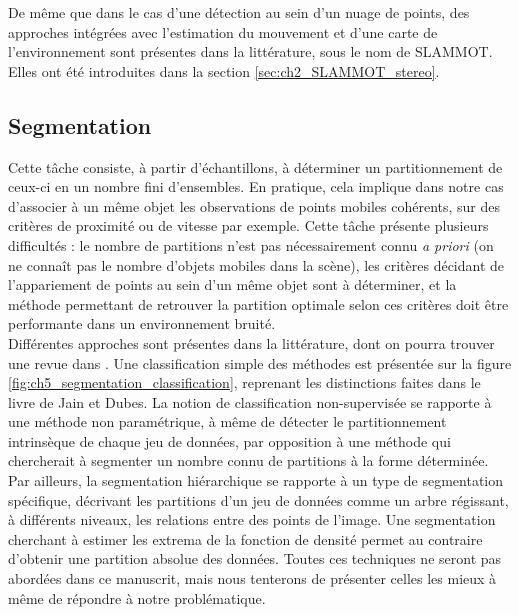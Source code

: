 De même que dans le cas d'une détection au sein d'un nuage de points, des approches intégrées avec l'estimation du mouvement et d'une carte de l'environnement sont présentes dans la littérature, sous le nom de SLAMMOT. Elles ont été introduites dans la section \ref{sec:ch2_SLAMMOT_stereo}. 

\subsection{Segmentation}
Cette tâche consiste, à partir d'échantillons, à déterminer un partitionnement de ceux-ci en un nombre fini d'ensembles. En pratique, cela implique dans notre cas d'associer à un même objet les observations de points mobiles cohérents, sur des critères de proximité ou de vitesse par exemple. Cette tâche présente plusieurs difficultés : le nombre de partitions n'est pas nécessairement connu \emph{a priori} (on ne connaît pas le nombre d'objets mobiles dans la scène), les critères décidant de l'appariement de points au sein d'un même objet sont à déterminer, et la méthode permettant de retrouver la partition optimale selon ces critères doit être performante dans un environnement bruité.\\
Différentes approches sont présentes dans la littérature, dont on pourra trouver une revue dans \cite{Jain1988}. Une classification simple des méthodes est présentée sur la figure \ref{fig:ch5_segmentation_classification}, reprenant les distinctions faites dans le livre de Jain et Dubes. La notion de classification non-supervisée se rapporte à une méthode non paramétrique, à même de détecter le partitionnement intrinsèque de chaque jeu de données, par opposition à une méthode qui chercherait à segmenter un nombre connu de partitions à la forme déterminée. Par ailleurs, la segmentation hiérarchique se rapporte à un type de segmentation spécifique, décrivant les partitions d'un jeu de données comme un arbre régissant, à différents niveaux, les relations entre des points de l'image. Une segmentation cherchant à estimer les extrema de la fonction de densité permet au contraire d'obtenir une partition \og absolue\fg{} des données. Toutes ces techniques ne seront pas abordées dans ce manuscrit, mais nous tenterons de présenter celles les mieux à même de répondre à notre problématique.

